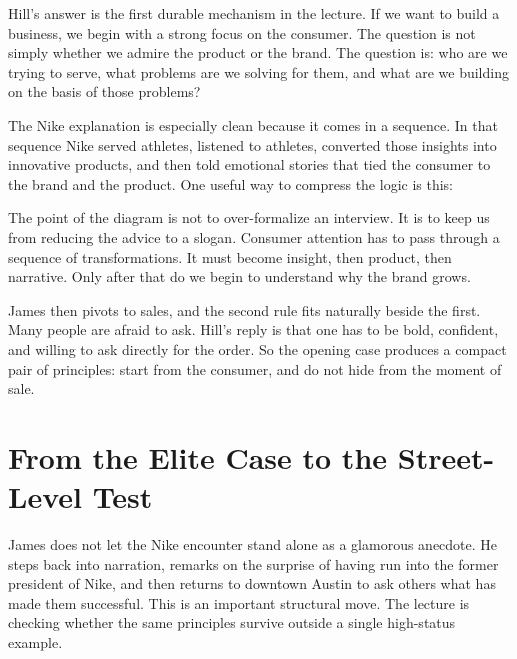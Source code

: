 Hill's answer is the first durable mechanism in the lecture. If we want to build a business, we begin with a strong focus on the consumer. The question is not simply whether we admire the product or the brand. The question is: who are we trying to serve, what problems are we solving for them, and what are we building on the basis of those problems?

The Nike explanation is especially clean because it comes in a sequence. In that sequence Nike served athletes, listened to athletes, converted those insights into innovative products, and then told emotional stories that tied the consumer to the brand and the product. One useful way to compress the logic is this:

\begin{figure}
\centering
{}
\end{figure}

The point of the diagram is not to over-formalize an interview. It is to keep us from reducing the advice to a slogan. Consumer attention has to pass through a sequence of transformations. It must become insight, then product, then narrative. Only after that do we begin to understand why the brand grows.

James then pivots to sales, and the second rule fits naturally beside the first. Many people are afraid to ask. Hill's reply is that one has to be bold, confident, and willing to ask directly for the order. So the opening case produces a compact pair of principles: start from the consumer, and do not hide from the moment of sale.

\section{From the Elite Case to the Street-Level Test}

James does not let the Nike encounter stand alone as a glamorous anecdote. He steps back into narration, remarks on the surprise of having run into the former president of Nike, and then returns to downtown Austin to ask others what has made them successful. This is an important structural move. The lecture is checking whether the same principles survive outside a single high-status example.

